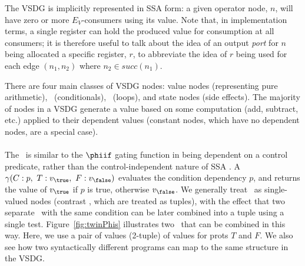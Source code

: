 {The VSDG is implicitly represented in SSA form: 
a given operator node, $n$, will have zero or more $E_V$-consumers using its value. 
Note that, in implementation terms, a single register can hold the produced value for consumption at all consumers; 
it is therefore useful to talk about the idea of an output {\em port} for $n$ being allocated a specific register, $r$, to abbreviate the idea of $r$ being used for each edge $(n_1,n_2)$ where $n_2 \in \textit{succ}(n_1)$.


There are four main classes of VSDG nodes: 
value nodes (representing pure arithmetic), \Gns\ (conditionals), \Tns\ (loops), and state nodes (side effects). 
The majority of nodes in a VSDG generate a value based on some computation (add, subtract, etc.) applied to their dependent values (constant nodes, which have no dependent nodes, are a special case).



\paragraph{\Gns}
The \Gn\ is similar to the $\phiif$ gating function in being dependent on a control predicate, rather than the control-independent nature of SSA \phifuns.
A \Gn\ $\gamma(C:p,\ T:v_{\true},\ F:v_{\false})$ evaluates the condition dependency $p$, and returns the value of $v_{\true}$ if $p$ is true, otherwise $v_{\false}$.
We generally treat \Gns\ as single-valued nodes (contrast \Tns, which are treated as tuples), with the effect that two separate \Gns\ with the same condition can be later combined into a tuple using a single test. 
Figure~\ref{fig:twinPhis} illustrates two \Gns\ that can be combined in this way. 
Here, we use a pair of values (2-tuple) of values for prots $T$ and $F$. 
We also see how two syntactically different programs can map to the same structure in the VSDG.

}
